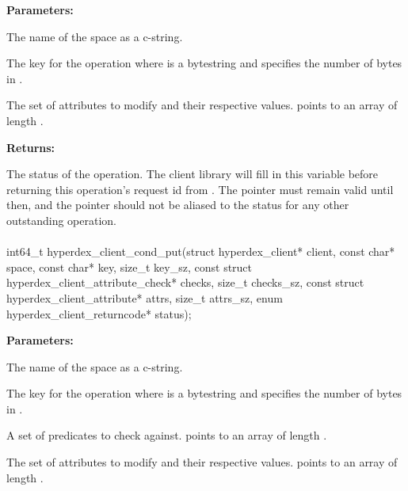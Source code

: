 \noindent\textbf{Parameters:}
\begin{description}[labelindent=\widthof{{\code{attrs}, \code{attrs\_sz}}},leftmargin=*,noitemsep,nolistsep,align=right]
\item[\code{space}] The name of the space as a c-string.
\item[\code{key}, \code{key\_sz}] The key for the operation where  is a bytestring and  specifies the number of bytes in .
\item[\code{attrs}, \code{attrs\_sz}] The set of attributes to modify and their respective values.   points to an array of length .
\end{description}

\noindent\textbf{Returns:}
\begin{description}[labelindent=\widthof{{\code{status}}},leftmargin=*,noitemsep,nolistsep,align=right]
\item[\code{status}] The status of the operation.  The client library will fill in this variable before returning this operation's request id from .  The pointer must remain valid until then, and the pointer should not be aliased to the status for any other outstanding operation.
\end{description}

\paragraph{}
\label{api:c:cond_put}
\begin{ccode}
int64_t hyperdex_client_cond_put(struct hyperdex_client* client,
                const char* space,
                const char* key, size_t key_sz,
                const struct hyperdex_client_attribute_check* checks, size_t checks_sz,
                const struct hyperdex_client_attribute* attrs, size_t attrs_sz,
                enum hyperdex_client_returncode* status);
\end{ccode}
\funcdesc 

\noindent\textbf{Parameters:}
\begin{description}[labelindent=\widthof{{\code{checks}, \code{checks\_sz}}},leftmargin=*,noitemsep,nolistsep,align=right]
\item[\code{space}] The name of the space as a c-string.
\item[\code{key}, \code{key\_sz}] The key for the operation where  is a bytestring and  specifies the number of bytes in .
\item[\code{checks}, \code{checks\_sz}] A set of predicates to check against.   points to an array of length .
\item[\code{attrs}, \code{attrs\_sz}] The set of attributes to modify and their respective values.   points to an array of length .
\end{description}

